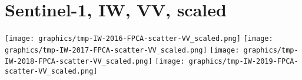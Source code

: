 
\section{Sentinel-1, IW, VV, scaled}
\setcounter{theorem}{0}

\renewcommand{\theenumi}{\roman{enumi}}
\renewcommand{\labelenumi}{\textnormal{(\theenumi)}$\;\;$}


\begin{center}
\begin{minipage}{7.0in}
\texttt{[image: graphics/tmp-IW-2016-FPCA-scatter-VV\_scaled.png]}
\quad
\texttt{[image: graphics/tmp-IW-2017-FPCA-scatter-VV\_scaled.png]}
\vskip 0.5cm
\texttt{[image: graphics/tmp-IW-2018-FPCA-scatter-VV\_scaled.png]}
\quad
\texttt{[image: graphics/tmp-IW-2019-FPCA-scatter-VV\_scaled.png]}
\end{minipage}
\end{center}


\renewcommand{\theenumi}{\roman{enumi}}
\renewcommand{\labelenumi}{\textnormal{(\theenumi)}$\;\;$}

